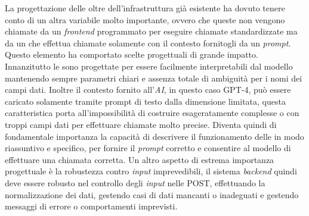 La progettazione delle  oltre dell'infrastruttura già esistente ha dovuto tenere conto di un altra variabile molto importante, ovvero che queste  non vengono chiamate da un \textit{frontend} programmato per eseguire chiamate standardizzate ma da un  che effettua chiamate solamente con il contesto fornitogli da un \textit{prompt}. Questo elemento ha comportato scelte progettuali di grande impatto. Innanzitutto le  sono progettate per essere facilmente interpretabili dal modello mantenendo sempre parametri chiari e assenza totale di ambiguità per i nomi dei campi dati. Inoltre il contesto fornito all'\textit{AI}, in questo caso GPT-4, può essere caricato solamente tramite prompt di testo dalla dimensione limitata, questa caratteristica porta all'impossibilità di costruire  esageratamente complesse o con troppi campi dati per effettuare chiamate molto precise. Diventa quindi di fondamentale importanza la capacità di descrivere il funzionamento delle  in modo riassuntivo e specifico, per fornire il \textit{prompt} corretto e consentire al modello  di effettuare una chiamata corretta. Un altro aspetto di estrema importanza progettuale è la robustezza contro \textit{input} imprevedibili, il sistema \textit{backend} quindi deve essere robusto nel controllo degli \textit{input} nelle  POST, effettuando la normalizzazione dei dati, gestendo casi di dati mancanti o inadeguati e gestendo messaggi di errore o comportamenti imprevisti.


